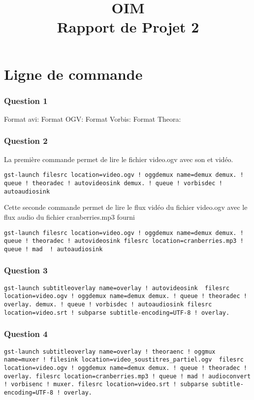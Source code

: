 \documentclass[10pt,a4paper]{article}
\title{OIM\\ Rapport de Projet 2}
\date{}
\begin{document}
\maketitle

\part*{Ligne de commande}
\section*{Question 1}
Format avi: 
Format OGV:
Format Vorbis:
Format Theora:
\section*{Question 2}

La première commande permet de lire le fichier video.ogv avec son et vidéo.
\begin{lstlisting}
gst-launch filesrc location=video.ogv ! oggdemux name=demux demux. ! queue ! theoradec ! autovideosink demux. ! queue ! vorbisdec ! autoaudiosink 
\end{lstlisting}

Cette seconde commande permet de lire le flux vidéo du fichier video.ogv avec le flux audio du fichier cranberries.mp3 fourni
\begin{lstlisting}
gst-launch filesrc location=video.ogv ! oggdemux name=demux demux. ! queue ! theoradec ! autovideosink filesrc location=cranberries.mp3 ! queue ! mad  ! autoaudiosink
\end{lstlisting}

\section*{Question 3}

\begin{lstlisting}
gst-launch subtitleoverlay name=overlay ! autovideosink  filesrc location=video.ogv ! oggdemux name=demux demux. ! queue ! theoradec ! overlay. demux. ! queue ! vorbisdec ! autoaudiosink filesrc location=video.srt ! subparse subtitle-encoding=UTF-8 ! overlay.

\end{lstlisting}

\section*{Question 4}

\begin{lstlisting}
gst-launch subtitleoverlay name=overlay ! theoraenc ! oggmux name=muxer ! filesink location=video_soustitres_partiel.ogv  filesrc location=video.ogv ! oggdemux name=demux demux. ! queue ! theoradec ! overlay. filesrc location=cranberries.mp3 ! queue ! mad ! audioconvert ! vorbisenc ! muxer. filesrc location=video.srt ! subparse subtitle-encoding=UTF-8 ! overlay.


\end{lstlisting}
\end{document}
